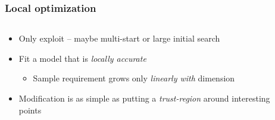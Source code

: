 \documentclass[aspectratio=169]{beamer}
\begin{document}
\begin{frame}
\frametitle{Local optimization}

\begin{columns}
\begin{column}{0.5\textwidth}
\begin{itemize}
\item Only exploit -- maybe multi-start or large initial search
\item Fit a model that is {\sl locally accurate}
\begin{itemize}
\item Sample requirement grows only {\sl linearly with} dimension
\end{itemize}
\item Modification is as simple as putting a {\sl trust-region} around interesting points
\end{itemize}
\end{column}
\begin{column}{0.5\textwidth}

\end{column}
\end{columns}

\end{frame}
\end{document}
